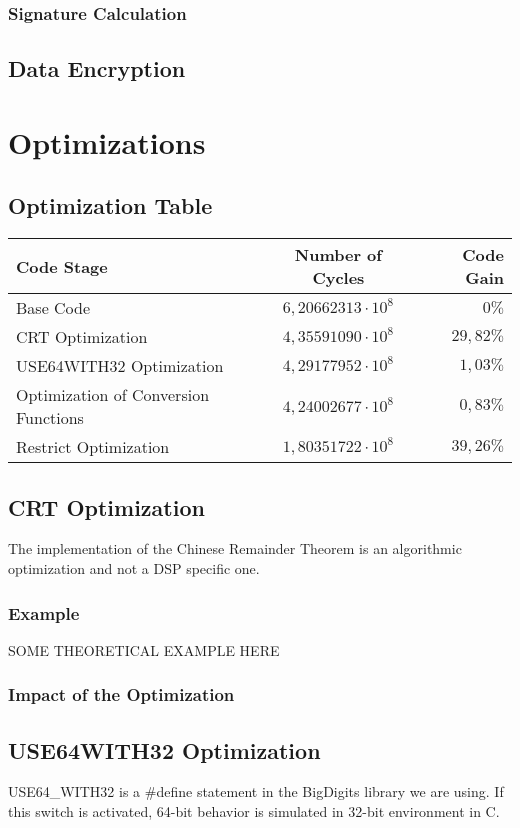 \documentclass[a4paper]{article}
\begin{document}
\subsubsection{Signature Calculation}

\subsection{Data Encryption}

\section{Optimizations}
\subsection{Optimization Table}
\begin{center}
	\begin{tabular}{| l | c | r |}
		\hline
		Code Stage & Number of Cycles & Code Gain \\ \hline
		Base Code & $6,20662313 \cdot 10^{8}$ 	& $0\%$ \\
		CRT Optimization & $4,35591090 \cdot 10^{8}$ & $29,82\%$ \\
		USE64WITH32 Optimization 	& $4,29177952 \cdot 10^{8}$ & $1,03\%$ \\
		Optimization of Conversion Functions & $4,24002677 \cdot 10^{8}$ & $0,83\%$ \\
		Restrict Optimization	 & $1,80351722 \cdot 10^{8}$ & $39,26\%$ \\
		\hline
	\end{tabular}
\end{center}
\subsection{CRT Optimization}
	The implementation of the Chinese Remainder Theorem is an algorithmic optimization and not a DSP specific one. 
	\subsubsection{Example}
		SOME THEORETICAL EXAMPLE HERE
	\subsubsection{Impact of the Optimization}
\subsection{USE64WITH32 Optimization}
	USE64\_WITH32 is a $\#$define statement in the BigDigits library we are using. If this switch is activated, 64-bit behavior is simulated in 32-bit environment in C.
\end{document}
